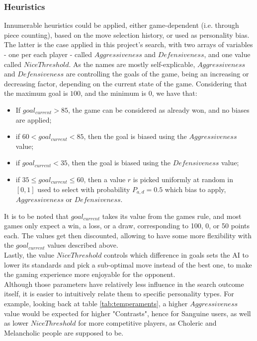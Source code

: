 \subsubsection*{Heuristics}
Innumerable heuristics could be applied, either game-dependent (i.e. through piece counting\cite{helgadottir2016virtual}), based on the move selection history\cite{schaeffer1989history}, or used as personality bias. The latter is the case applied in this project's search, with two arrays of variables - one per each player - called $Aggressiveness$ and $Defensiveness$, and one value called $NiceThreshold$. As the names are mostly self-explicable, $Aggressiveness$ and $Defensiveness$ are controlling the goals of the game, being an increasing or decreasing factor, depending on the current state of the game. Considering that the maximum goal is $100$, and the minimum is $0$, we have that:
\begin{itemize}
\item If $goal_{current}>85$, the game can be considered as already won, and no biases are applied;
\item if $60<goal_{current}<85$, then the goal is biased using the $Aggressiveness$ value;
\item if $goal_{current}<35$, then the goal is biased using the $Defensiveness$ value;
\item if $35 \leq goal_{current} \leq 60$, then a value $r$ is picked uniformly at random in $[0,1]$ used to select with probability $P_{a,d}=0.5$ which bias to apply, $Aggressiveness$ or $Defensiveness$.
\end{itemize}
It is to be noted that $goal_{current}$ takes its value from the games rule, and most games only expect a win, a loss, or a draw, corresponding to 100, 0, or 50 points each. The values get then discounted, allowing to have some more flexibility with the $goal_{current}$ values described above.\\
Lastly, the value $NiceThreshold$ controls which difference in goals sets the AI to lower its standards and pick a sub-optimal move instead of the best one, to make the gaming experience more enjoyable for the opponent\cite{helgadottir2016virtual}.\\
Although those parameters have relatively less influence in the search outcome itself, it is easier to intuitively relate them to specific personality types. For example, looking back at table \ref{tab:temperaments}, a higher $Aggressiveness$ value would be expected for higher "Contrasts", hence for Sanguine users, as well as lower $NiceThreshold$ for more competitive players, as Choleric and Melancholic people are supposed to be.\\
